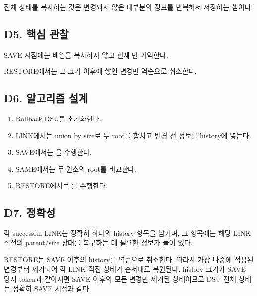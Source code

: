 전체 상태를 복사하는 것은 변경되지 않은 대부분의 정보를 반복해서 저장하는 셈이다.

\subsection*{D5. 핵심 관찰}
SAVE 시점에는 배열을 복사하지 않고 현재 만 기억한다.

RESTORE에서는 그 크기 이후에 쌓인 변경만 역순으로 취소한다.

\subsection*{D6. 알고리즘 설계}
\begin{enumerate}
\item Rollback DSU를 초기화한다.
\item LINK에서는 union by size로 두 root를 합치고 변경 전 정보를 history에 넣는다.
\item SAVE에서는 을 수행한다.
\item SAME에서는 두 원소의 root를 비교한다.
\item RESTORE에서는 를 수행한다.
\end{enumerate}

\subsection*{D7. 정확성}
각 successful LINK는 정확히 하나의 history 항목을 남기며, 그 항목에는 해당 LINK 직전의 parent/size 상태를 복구하는 데 필요한 정보가 들어 있다.

RESTORE는 SAVE 이후의 history를 역순으로 취소한다. 따라서 가장 나중에 적용된 변경부터 제거되어 각 LINK 직전 상태가 순서대로 복원된다. history 크기가 SAVE 당시 token과 같아지면 SAVE 이후의 모든 변경만 제거된 상태이므로 DSU 전체 상태는 정확히 SAVE 시점과 같다.

